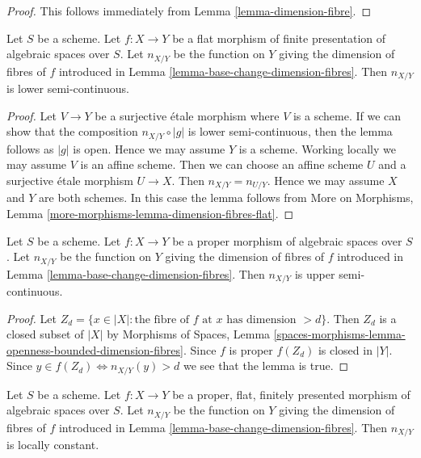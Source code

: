 \begin{proof}
This follows immediately from
Lemma \ref{lemma-dimension-fibre}.
\end{proof}

\begin{lemma}
\label{lemma-dimension-fibres-flat}
Let $S$ be a scheme.
Let $f : X \to Y$ be a flat morphism of finite presentation of
algebraic spaces over $S$. Let
$n_{X/Y}$ be the function on $Y$ giving the dimension of fibres of $f$
introduced in Lemma \ref{lemma-base-change-dimension-fibres}.
Then $n_{X/Y}$ is lower semi-continuous.
\end{lemma}

\begin{proof}
Let $V \to Y$ be a surjective \'etale morphism where $V$ is a scheme.
If we can show that the composition $n_{X/Y} \circ |g|$
is lower semi-continuous, then the lemma follows as $|g|$ is open.
Hence we may assume $Y$ is a scheme.
Working locally we may assume $V$ is an affine scheme.
Then we can choose an affine scheme $U$ and a surjective
\'etale morphism $U \to X$. Then $n_{X/Y} = n_{U/Y}$.
Hence we may assume $X$ and $Y$ are both schemes.
In this case the lemma follows from
More on Morphisms, Lemma \ref{more-morphisms-lemma-dimension-fibres-flat}.
\end{proof}

\begin{lemma}
\label{lemma-dimension-fibres-proper}
Let $S$ be a scheme.
Let $f : X \to Y$ be a proper morphism of algebraic spaces over $S$. Let
$n_{X/Y}$ be the function on $Y$ giving the dimension of fibres of $f$
introduced in Lemma \ref{lemma-base-change-dimension-fibres}.
Then $n_{X/Y}$ is upper semi-continuous.
\end{lemma}

\begin{proof}
Let $Z_d = \{x \in |X| :
\text{the fibre of }f\text{ at }x\text{ has dimension }> d\}$.
Then $Z_d$ is a closed subset of $|X|$ by
Morphisms of Spaces, Lemma
\ref{spaces-morphisms-lemma-openness-bounded-dimension-fibres}.
Since $f$ is proper $f(Z_d)$ is closed in $|Y|$.
Since $y \in f(Z_d) \Leftrightarrow n_{X/Y}(y) > d$
we see that the lemma is true.
\end{proof}

\begin{lemma}
\label{lemma-dimension-fibres-proper-flat}
Let $S$ be a scheme. Let $f : X \to Y$ be a proper, flat, finitely presented
morphism of algebraic spaces over $S$.
Let $n_{X/Y}$ be the function on $Y$ giving the dimension of fibres of $f$
introduced in Lemma \ref{lemma-base-change-dimension-fibres}.
Then $n_{X/Y}$ is locally constant.
\end{lemma}

